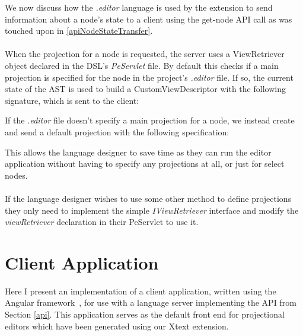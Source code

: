 \documentclass{article}
\begin{document}
{We now discuss how the \emph{.editor} language is used by the extension to send information about a node's state to a client using the get-node API call as was touched upon in \ref{apiNodeStateTransfer}. 
\\
\\
When the projection for a node is requested, the server uses a ViewRetriever object declared in the DSL's \emph{PeServlet} file. By default this checks if a main projection is specified for the node in the project's \emph{.editor} file. If so, the current state of the AST is used to build a CustomViewDescriptor with the following signature, which is sent to the client: 

\vspace*{0.1cm}
If the \emph{.editor} file doesn't specify a main projection for a node, we instead create and send a default projection with the following specification: 

This allows the language designer to save time as they can run the editor application without having to specify any projections at all, or just for select nodes. 
\\
\\
If the language designer wishes to use some other method to define projections they only need to implement the simple \emph{IViewRetriever} interface and modify the \emph{viewRetriever} declaration in their PeServlet to use it.


\section{Client Application}\label{clientApp}
Here I present an implementation of a client application, written using the Angular framework~\cite{angular}, for use with a language server implementing the API from Section \ref{api}. This application serves as the default front end for projectional editors which have been generated using our Xtext extension. 

}
\end{document}

